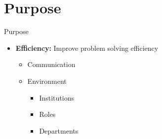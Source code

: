 \section{Purpose}
\begin{frame}{Purpose}

\begin{itemize}
	\item \textbf{Efficiency:} Improve problem solving efficiency
	\begin{itemize}
		\item Communication
		\item Environment
		\begin{itemize}
			\item Institutions
			\item Roles
			\item Departments
			\end{itemize}
	\end{itemize}
\end{itemize}


\end{frame}
